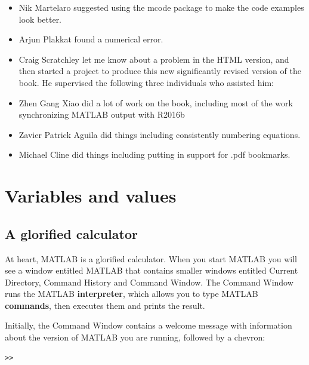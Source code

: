 \documentclass{book}
\begin{document}
\begin{itemize}
\item Nik Martelaro suggested using the mcode package to make the
code examples look better.

\item Arjun Plakkat found a numerical error.

\item Craig Scratchley let me know about a problem in the HTML version, 
and then started a project to produce this new significantly revised version 
of the book.  He supervised the following three individuals who assisted him:

\item Zhen Gang Xiao did a lot of work on the book, including most 
of the work synchronizing MATLAB output with R2016b 

\item Zavier Patrick Aguila did things including consistently numbering equations.

\item Michael Cline did things including putting in support for .pdf bookmarks.

\end{itemize}


\tableofcontents

\mainmatter

\chapter{Variables and values}

\section{A glorified calculator}
\label{calc}

At heart, MATLAB is a glorified calculator.  When you start MATLAB
you will see a window
entitled {\sf MATLAB} that contains smaller windows entitled {\sf
Current Directory}, {\sf Command History} and {\sf Command Window}.
The Command Window runs the MATLAB {\bf interpreter}, which allows you
to type MATLAB {\bf commands}, then executes them and prints the
result.

Initially, the Command Window contains a welcome message with information
about the version of MATLAB you are running, followed by a chevron:

\begin{verbatim}
>>
\end{verbatim}
\end{document}
